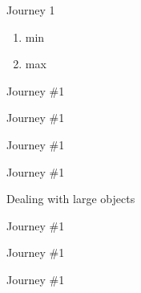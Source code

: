 \documentclass[10pt]{beamer}
\begin{document}
\begin{frame}{Journey 1}
    \begin{enumerate}
        \item min
        \item max
    \end{enumerate}
\end{frame}

\begin{frame}{Journey \#1}
    \begin{block}{}
		
	\end{block}
\end{frame}

\begin{frame}{Journey \#1}
    \begin{block}{}
		
	\end{block}
\end{frame}


\begin{frame}{Journey \#1}
    \begin{block}{}
		
	\end{block}
\end{frame}

\begin{frame}{Journey \#1}
    \begin{block}{Dealing with large objects}
		
	\end{block}
\end{frame}

\begin{frame}{Journey \#1}
    \begin{block}{}
		
	\end{block}
\end{frame}

\begin{frame}{Journey \#1}
    \begin{block}{}
		
	\end{block}
\end{frame}

\begin{frame}{Journey \#1}
    \begin{block}{}
		
	\end{block}
\end{frame}
\end{document}
